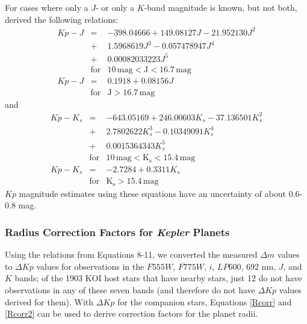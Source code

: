 \documentclass[twocolumn,appendixfloats]{aastex6}
\begin{document}
For cases where only a $J$- or only a $K$-band magnitude is known, but
not both, \citet{howell12} derived the following relations:
\begin{eqnarray*}
Kp - J & = & -398.04666 + 149.08127 J - 21.952130 J^2 \nonumber \\
& + & 1.5968619 J^3 - 0.057478947 J^4 \nonumber \\
& + & 0.00082033223 J^5 \nonumber \\
& \mathrm{for} & \mathrm{10\, mag < J < 16.7\, mag} \nonumber \\
Kp - J & = & 0.1918 + 0.08156 J \nonumber \\
& \mathrm{for} & \mathrm{J > 16.7\, mag}
\end{eqnarray*} 
and
\begin{eqnarray}
Kp - K_s & = & -643.05169 + 246.00603 K_s - 37.136501 K_s^2 \nonumber \\
& + & 2.7802622 K_s^3 - 0.10349091 K_s^4 \nonumber \\
& + & 0.0015364343 K_s^5 \nonumber \\
& \mathrm{for} & \mathrm{10\, mag < K_s < 15.4\, mag} \nonumber \\
Kp - K_s & = & -2.7284 + 0.3311 K_s \nonumber \\
& \mathrm{for} & \mathrm{K_s > 15.4\, mag}
\end{eqnarray} 
$Kp$ magnitude estimates using these equations have an uncertainty
of about 0.6-0.8 mag. 

\newpage

\subsubsection{Radius Correction Factors for {\it Kepler} Planets}

Using the relations from Equations 8-11, we converted the measured $\Delta m$ 
values to $\Delta Kp$ values for observations in the $F555W$, $F775W$, $i$, 
$LP600$, 692 nm, $J$, and $K$ bands; of the 1903 KOI host stars that
have nearby stars, just 12 do not have observations in any of these seven
bands (and therefore do not have $\Delta Kp$ values derived for them).
With $\Delta Kp$ for the companion stars, Equations \ref{Rcorr} and
\ref{Rcorr2} can be used to derive correction factors for the planet radii.
\end{document}
